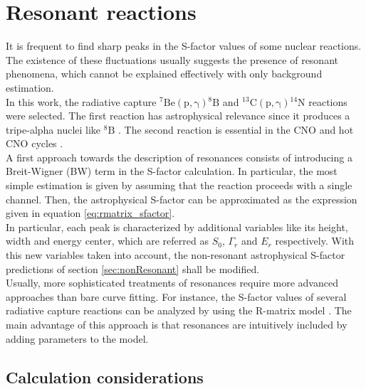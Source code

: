 \documentclass[openany]{book}
\begin{document}
\section{Resonant reactions} \label{sec:resonant}

It is frequent to find sharp peaks in the S-factor values of some nuclear reactions. The existence of these fluctuations usually suggests the presence of resonant phenomena, which cannot be explained effectively with only background estimation. \\

In this work, the radiative capture $\mathrm{{}^{7}{Be}(p, \gamma){}^{8}{B} } $ and $\mathrm{{}^{13}{C}(p, \gamma){}^{14}{N}} $ reactions were selected. The first reaction has astrophysical relevance since it produces a tripe-alpha nuclei like $\mathrm{{}^{8}B}$ \cite{coc_2012}. The second reaction is essential in the CNO and hot CNO cycles \cite{wiescher_gorres_schatz_1999}. \\

A first approach towards the description of resonances consists of introducing a Breit-Wigner (BW) term in the S-factor calculation. In particular, the most simple estimation is given by assuming that the reaction proceeds with a single channel. Then, the astrophysical S-factor can be approximated as the expression given in equation \ref{eq:rmatrix_sfactor}. \\

In particular, each peak is characterized by additional variables like its height, width and energy center, which are referred as $S_0$, $\Gamma_r$ and $E_r$ respectively. With this new variables taken into account, the non-resonant astrophysical S-factor predictions of section \ref{sec:nonResonant} shall be modified.\\

Usually, more sophisticated treatments of resonances require more advanced approaches than bare curve fitting. For instance, the S-factor values of several radiative capture reactions can be analyzed by using the R-matrix model \cite{descouvemont_adahchour_angulo_coc_vangioni-flam_2004}. The main advantage of this approach is that resonances are intuitively included by adding parameters to the model.

\subsection{Calculation considerations} \label{sub:considerationsResonant}
\end{document}

